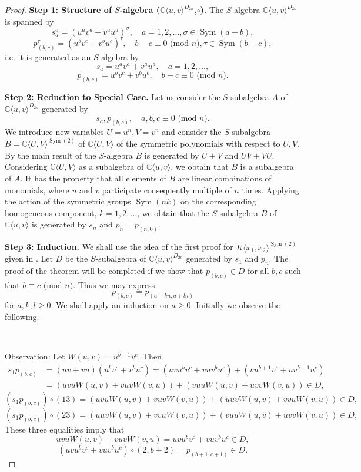 \documentclass{amsart}[12pt]
\theoremstyle{definition}
\DeclareMathOperator{\Sym}{Sym}
\newcommand{\CuvD}{{\mathbb C}\langle u,v\rangle^{D_{2n}}}
\begin{document}
\begin{proof}
	
	
\noindent\textbf{Step 1: Structure of $S$-algebra ($\CuvD$,$\circ$).} The $S$-algebra ${\mathbb C}\langle u,v\rangle^{D_{2n}}$ is spanned by
\[
s_a^{\sigma}=(u^av^a+v^au^a)^{\sigma},\quad a=1,2,\ldots,\sigma\in \Sym(a+b),
\]
\[
p_{(b,c)}^{\tau}=(u^bv^c+v^bu^c)^{\tau}, \quad b-c\equiv 0\text{ (mod $n$)},\tau\in \Sym(b+c),
\]
i.e. it is generated as an $S$-algebra by
\[
s_a=u^av^a+v^au^a, \quad a=1,2,\ldots,
\]
\[
p_{(b,c)}=u^bv^c+v^bu^c, \quad b-c\equiv 0\text{ (mod $n$)}.
\]
	
\noindent\textbf{Step 2: Reduction to Special Case.} Let us consider the $S$-subalgebra $A$ of ${\mathbb C}\langle u,v\rangle^{D_{2n}}$ generated by
\[
s_a,p_{(b,c)},\quad a,b,c\equiv 0\text{ (mod $n$)}.
\]
We introduce new variables $U=u^n,V=v^n$ and consider the $S$-subalgebra $B={\mathbb C}\langle U,V\rangle^{\Sym(2)}$ of ${\mathbb C}\langle U,V\rangle$
of the symmetric polynomials with respect to $U,V$. By the main result of \cite{BDDK} the $S$-algebra $B$ is generated by $U+V$ and $UV+VU$.
Considering ${\mathbb C}\langle U,V\rangle$ as a subalgebra of ${\mathbb C}\langle u,v\rangle$, we obtain that $B$ is a subalgebra of $A$.
It has the property that all elements of $B$ are linear combinations of monomials, where $u$ and $v$ participate consequently multiple of $n$ times.
Applying the action of the symmetric groups $\Sym(nk)$ on the corresponding homogeneous component, $k=1,2,\ldots$,
we obtain that the $S$-subalgebra $B$ of ${\mathbb C}\langle u,v\rangle$
is generated by $s_n$ and $p_n=p_{(n,0)}$.
	
\noindent\textbf{Step 3: Induction.}
 We shall use the idea of the first proof  for $K\langle x_1,x_2\rangle^{\Sym(2)}$ given in \cite[Remark 4.6]{BDDK}.
Let $D$ be the $S$-subalgebra of $\CuvD$ generated by $s_1$ and $p_n$.
The proof of the theorem will be completed
if we show that $p_{(b,c)}\in D$ for all $b,c$ such that
$b\equiv c\text{ (mod $n$)}$.
Thus we may express
\[
p_{(b,c)}=p_{(a+kn,a+ln)}
\]
for $a,k,l\geq0$. We shall apply an induction on $a\geq0$. Initially we observe the following.

\

\noindent Observation: Let $W(u,v)=u^{b-1}v^c$. Then
\begin{align}
	s_1p_{(b,c)}&=(uv+vu)(u^bv^c+v^bu^c)=(uvu^bv^c+vuv^bu^c)+(vu^{b+1}v^c+uv^{b+1}u^c)\nonumber\\
	&=(uvuW(u,v)+vuvW(v,u))+(vuuW(u,v)+uvvW(v,u))\in D,\nonumber
\end{align}
\[
(s_1p_{(b,c)})\circ(13)=(uvuW(u,v)+vuvW(v,u))+(uuvW(u,v)+vvuW(v,u))\in D,
\]
\[
(s_1p_{(b,c)})\circ(23)=(uuvW(u,v)+vvuW(v,u))+(vuuW(u,v)+uvvW(v,u))\in D,
\]
These three equalities imply that
\[
uvuW(u,v)+vuvW(v,u)=uvu^bv^c+vuv^bu^c\in D,
\]
\[
(uvu^bv^c+vuv^bu^c)\circ (2,b+2)=p_{(b+1,c+1)}\in D.
\]



\end{proof}
\end{document}
